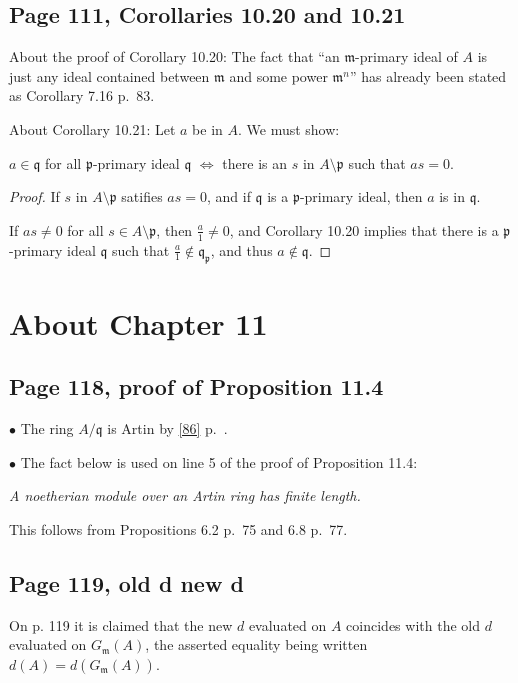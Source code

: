 \documentclass[parskip=half,fontsize=12pt]{scrartcl}%
\newcommand{\mf}{\mathfrak}
\newcommand{\mmm}{\mf m}
\newcommand{\ppp}{\mf p}
\newcommand{\bu}{\bullet}
\begin{document}
\subsection{Page 111, Corollaries 10.20 and 10.21}%

About the proof of Corollary 10.20: The fact that ``an $\mf m$-primary ideal of $A$ is just any ideal contained between $\mf m$ and some power $\mf m^n$'' has already been stated as Corollary 7.16 p.~83.

About Corollary 10.21: Let $a$ be in $A$. We must show: 

$a\in\mf q$ for all $\ppp$-primary ideal $\mf q$ $\iff$ there is an $s$ in $A\setminus\ppp$ such that $as=0$. 

\begin{proof} 
If $s$ in $A\setminus\ppp$ satifies $as=0$, and if $\mf q$ is a $\ppp$-primary ideal, then $a$ is in $\mf q$.

If $as\neq0$ for all $s\in A\setminus\ppp$, then $\frac a1\neq0$, and Corollary 10.20 implies that there is a $\ppp$-primary ideal $\mf q$ such that $\frac a1\notin\mf q_\ppp$, and thus $a\notin\mf q$. 
\end{proof}

\section{About Chapter 11}%

\subsection{Page 118, proof of Proposition 11.4}%

$\bu$ The ring $A/\mf q$ is Artin by \eqref{86} p.~\pageref{86}.

$\bu$ The fact below is used on line 5 of the proof of Proposition 11.4:

\emph{A noetherian module over an Artin ring has finite length.}

This follows from Propositions 6.2 p.~75 and 6.8 p.~77.

\subsection{Page 119, old d new d}\label{odnd}%

On p. 119 it is claimed that the new $d$ evaluated on $A$ coincides with the old $d$ evaluated on $G_\mmm(A)$, the asserted equality being written $d(A)=d(G_\mmm(A))$. 
\end{document}

